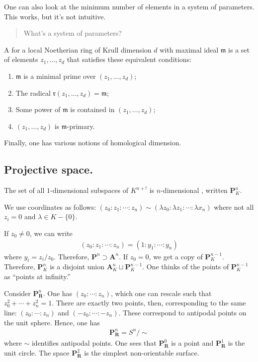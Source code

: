 \documentclass [11 pt, oneside] {article}
\begin{document}
One can also look at the minimum number of elements in a system of parameters. This works, but it's not intuitive. 
\begin{quote}
	\small What's a system of parameters?
\end{quote}
A  for a local Noetherian ring of Krull dimension $d$ with maximal ideal $\mathfrak{m}$ is a set of elements $z_1,\hdots, z_d$ that satisfies these equivalent conditions:
\begin{enumerate}
	\item $\mathfrak{m}$ is a minimal prime over $(z_1,\hdots, z_d)$;
	\item The radical $\mathfrak{r}{(z_1,\hdots, z_d)}=\mathfrak{m} $;
	\item Some power of $\mathfrak{m}$ is contained in $(z_1,\hdots, z_d)$;
	\item $(z_1,\hdots, z_d)$ is $\mathfrak{m}$-primary.
\end{enumerate}

Finally, one has various notions of homological dimension.

\subsection{Projective space.}
\begin{definition}[ ]\label{}
The set of all $1$-dimensional subspaces of $K^{n+!}$ is $n$-dimensional , written $\mathbf{P}^n_K$.
\end{definition}

We use coordinates as follows: $(z_0:z_1:\cdots : z_n)\sim (\lambda z_0:\lambda z_1:\cdots:\lambda x_n)$ where not all $z_i=0$ and $\lambda\in K - \{0\}$.

If $z_0\ne 0$, we can write
\begin{align*}
	(z_0:z_1:\cdots:z_n) = (1:y_1:\cdots : y_n)
\end{align*}
where $y_i = z_i/z_0$. Therefore, $\mathbf{P}^n \supset \mathbf{A}^n$. If $z_0=0$, we get a copy of $\mathbf{P}^{n-1}_K$. Therefore, $\mathbf{P}^n_K$ is a disjoint union $\mathbf{A}^n_K \sqcup \mathbf{P}^{n-1}_K $. One thinks of the points of $\mathbf{P}^{n-1}_K$ as ``points at infinity.''

Consider $\mathbf{P}^n_{\mathbf{R}}$. One has $(z_0:\cdots:z_n)$, which one can rescale such that $z_0^2 +\cdots+z_n^2 = 1$. There are exactly two points, then, corresponding to the same line: $(z_0:\cdots:z_n)$ and $(-z_0:\cdots:-z_n)$. These correspond to antipodal points on the unit sphere. Hence, one has
\begin{align*}
	\mathbf{P}^n_{\mathbf{R}} = S^n / \sim
\end{align*}
where $\sim$ identifies antipodal points. One sees that $\mathbf{P}^0_{\mathbf{R}}$ is a point and $\mathbf{P}^1_{\mathbf{R}}$ is the unit circle. The space $\mathbf{P}^2_{\mathbf{R}}$ is the simplest non-orientable surface.
\end{document}
